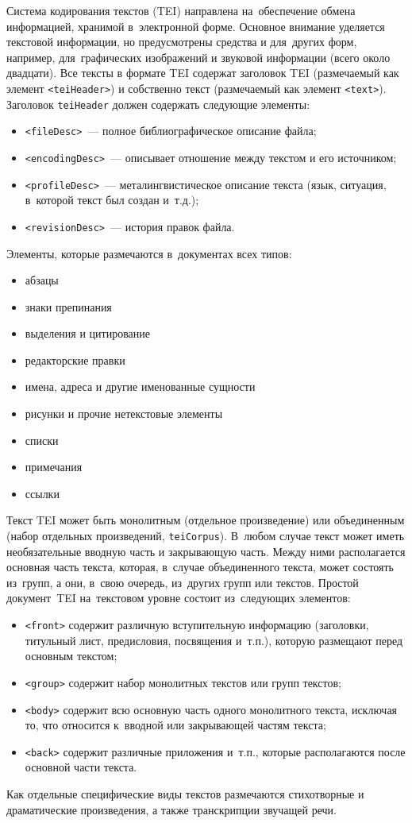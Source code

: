 \documentclass[12pt]{article}
\theoremstyle{definition}
\theoremstyle{remark}
\numberwithin{equation}{section}
\begin{document}
Система кодирования текстов (TEI) направлена на~обеспечение обмена
информацией, хранимой в~электронной форме. Основное внимание
уделяется текстовой информации, но предусмотрены средства и для~других
форм, например, для~графических изображений и звуковой информации
(всего около двадцати). Все тексты в формате TEI содержат заголовок
TEI (размечаемый как элемент \texttt{<teiHeader>}) и собственно текст
(размечаемый как элемент \texttt{<text>}). Заголовок \texttt{teiHeader}
должен содержать следующие элементы:
\begin{itemize}
    \item \texttt{<fileDesc>}~--- полное библиографическое описание файла;
    \item \texttt{<encodingDesc>}~--- описывает отношение между текстом
    и его источником;
    \item \texttt{<profileDesc>}~--- металингвистическое описание текста
    (язык, ситуация, в~которой текст был создан и~т.д.);
    \item \texttt{<revisionDesc>}~--- история правок файла.
\end{itemize}
Элементы, которые размечаются в~документах всех типов:
\begin{itemize}
    \item абзацы
    \item знаки препинания
    \item выделения и цитирование
    \item редакторские правки
    \item имена, адреса и другие именованные сущности
    \item рисунки и прочие нетекстовые элементы
    \item списки
    \item примечания
    \item ссылки
\end{itemize}
Текст TEI может быть монолитным (отдельное произведение) или
объединенным (набор отдельных произведений, \texttt{teiCorpus}).
В~любом случае текст может иметь необязательные вводную часть
и закрывающую часть. Между ними располагается основная часть
текста, которая, в~случае объединенного текста, может состоять
из~групп, а они, в~свою очередь, из~других групп или текстов.
Простой документ~TEI на~текстовом уровне состоит из~следующих
элементов:
\begin{itemize}
    \item \texttt{<front>} содержит различную вступительную
    информацию (заголовки, титульный лист, предисловия, посвящения
    и~т.п.), которую размещают перед основным текстом;
    \item \texttt{<group>} содержит набор монолитных текстов
    или групп текстов;
    \item \texttt{<body>} содержит всю основную часть одного
    монолитного текста, исключая то, что относится к~вводной
    или закрывающей частям текста;
    \item \texttt{<back>} содержит различные приложения и~т.п.,
    которые располагаются после основной части текста.
\end{itemize}
Как отдельные специфические виды текстов размечаются стихотворные
и драматические произведения, а также транскрипции звучащей речи.
\end{document}
